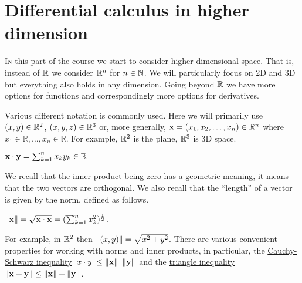 \chapter{Differential calculus in higher dimension}

\lettrine{I}{n} this part of the course we start to consider higher dimensional space.
That is, instead of \(\mathbb{R}\) we consider \(\mathbb{R}^n\) for \(n\in \mathbb{N}\).
We will particularly focus on 2D and 3D but everything also holds in any dimension.
Going beyond \(\mathbb{R}\) we have more options for functions and correspondingly more options for derivatives.

Various different notation is commonly used.
Here we will primarily use \((x,y)\in \mathbb{R}^2\), \((x,y,z)\in\mathbb{R}^3\) or, more generally,  \(\mathbf{x} =(x_1,x_2,\ldots,x_n) \in \mathbb{R}^n \)
where
\( x_1 \in \mathbb{R},\ldots, x_n \in \mathbb{R}\).
For example, \(\mathbb{R}^2\) is the plane, \(\mathbb{R}^3\) is 3D space.

\begin{definition}
    \(\mathbf{x} \cdot \mathbf{y} = \sum_{k=1}^{n} x_k y_k \in \mathbb{R}\)
\end{definition}

\noindent
We recall that the inner product being zero has a geometric meaning, it means that the two vectors are orthogonal.
We also recall that the ``length'' of a vector is given by the norm, defined as follows.

\begin{definition}[norm]
    \(\left\|\mathbf{x}\right\| =  \sqrt{\mathbf{x} \cdot \mathbf{x}} = (\sum_{k=1}^{n} x_k^2 )^{\frac{1}{2}}\).
\end{definition}

\noindent
For example, in \(\mathbb{R}^2\) then \(\left\|(x,y)\right\| = \sqrt{x^2 + y^2}\).
There are various convenient properties for working with norms and inner products, in particular, the \href{https://en.wikipedia.org/wiki/Cauchy%E2%80%93Schwarz_inequality}{Cauchy-Schwarz inequality} \(\left|x\cdot y\right| \leq \left\|\mathbf{x}\right\| \ \left\|\mathbf{y}\right\|\) and the \href{https://en.wikipedia.org/wiki/Triangle_inequality}{triangle inequality} \(\left\|\mathbf{x} + \mathbf{y}\right\| \leq \left\|\mathbf{x}\right\| + \left\|\mathbf{y}\right\|\).

